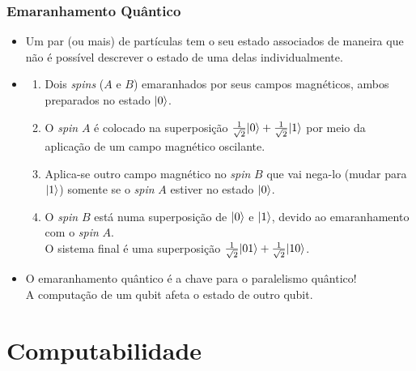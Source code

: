 \documentclass{beamer}
\DeclarePairedDelimiter\ket{\lvert}{\rangle}
\begin{document}
\begin{frame}
\frametitle{Emaranhamento Quântico}
\begin{itemize}
  \item Um par (ou mais) de partículas tem o seu estado associados de
  maneira que não é possível descrever o estado de uma delas
  individualmente.
\item
  \begin{enumerate}
    \item Dois \textit{spins} ($A$ e $B$) emaranhados por
      seus campos magnéticos, ambos preparados no estado $\ket{0}$.
    \item O \textit{spin} $A$ é colocado na superposição
      $\frac{1}{\sqrt{2}} \ket{0} + \frac{1}{\sqrt{2}} \ket{1}$ por meio da
      aplicação de um campo magnético oscilante.
    \item Aplica-se outro campo magnético no \textit{spin} $B$ que vai nega-lo (mudar para
      $\ket{1}$) somente se o \textit{spin} $A$ estiver no estado $\ket{0}$.
    \item O \textit{spin} $B$ está numa superposição de $\ket{0}$ e $\ket{1}$,
      devido ao emaranhamento com o \textit{spin} $A$.\\
      O sistema final é uma superposição
      $\frac{1}{\sqrt{2}} \ket{01} + \frac{1}{\sqrt{2}} \ket{10}$.
  \end{enumerate}
  \item O emaranhamento quântico é a chave para o paralelismo quântico!
    \\ A computação de um qubit afeta o estado de outro qubit.
\end{itemize}
\end{frame}

\section{Computabilidade}
\end{document}
